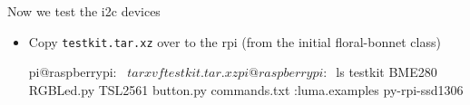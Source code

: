 \begin{frame}
   {Now we test the i2c devices}

   \begin{itemize}
	   \item Copy \verb?testkit.tar.xz? over to the rpi
		   (from the initial floral-bonnet class)
      \begin{raw}
pi@raspberrypi:~ $ tar xvf testkit.tar.xz 
pi@raspberrypi:~ $ ls testkit
BME280  RGBLed.py  TSL2561  button.py  commands.txt
:luma.examples  py-rpi-ssd1306
      \end{raw}

   \end{itemize}
\end{frame}

\cprotect\note{


}

